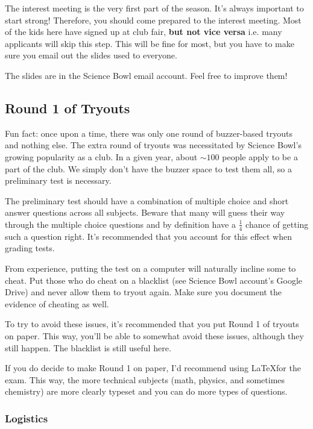 \documentclass[11pt, letterpaper]{article}
\begin{document}
The interest meeting is the very first part of the season.
It's always important to start strong!
Therefore, you should come prepared to the interest meeting.
Most of the kids here have signed up at club fair, \textbf{but not vice versa} i.e. many applicants will skip this step.
This will be fine for most, but you have to make sure you email out the slides used to everyone.

\noindent
The slides are in the Science Bowl email account.
Feel free to improve them!

\subsection{Round 1 of Tryouts}

Fun fact: once upon a time, there was only one round of buzzer-based tryouts and nothing else.
The extra round of tryouts was necessitated by Science Bowl's growing popularity as a club.
In a given year, about $\sim 100$ people apply to be a part of the club.
We simply don't have the buzzer space to test them all, so a preliminary test is necessary.

The preliminary test should have a combination of multiple choice and short answer questions across all subjects.
Beware that many will guess their way through the multiple choice questions and by definition have a $\frac{1}{4}$ chance of getting such a question right.
It's recommended that you account for this effect when grading tests.

From experience, putting the test on a computer will naturally incline some to cheat.
Put those who do cheat on a blacklist (see Science Bowl account's Google Drive) and never allow them to tryout again.
Make sure you document the evidence of cheating as well.

To try to avoid these issues, it's recommended that you put Round 1 of tryouts on paper.
This way, you'll be able to somewhat avoid these issues, although they still happen.
The blacklist is still useful here.

If you do decide to make Round 1 on paper, I'd recommend using \LaTeX for the exam.
This way, the more technical subjects (math, physics, and sometimes chemistry) are more clearly typeset and you can do more types of questions.

\subsubsection{Logistics}
\end{document}
